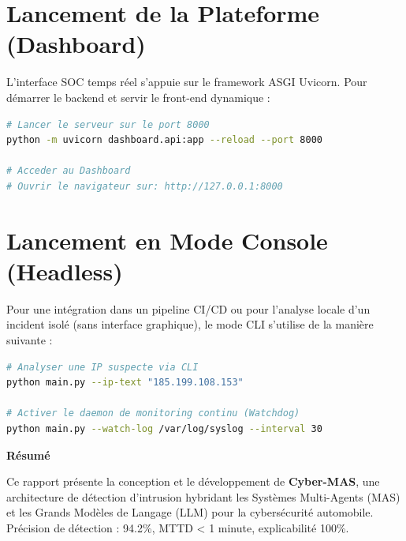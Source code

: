 \documentclass[a4paper, 12pt]{report}
\begin{document}
\section{Lancement de la Plateforme (Dashboard)}
L'interface SOC temps réel s'appuie sur le framework ASGI Uvicorn. Pour démarrer le backend et servir le front-end dynamique :
\begin{lstlisting}[language=bash, basicstyle=\footnotesize\ttfamily\color{codeid}, caption={Lancement du serveur Uvicorn pour l\'API et le Dashboard.}]
# Lancer le serveur sur le port 8000
python -m uvicorn dashboard.api:app --reload --port 8000

# Acceder au Dashboard
# Ouvrir le navigateur sur: http://127.0.0.1:8000
\end{lstlisting}

\section{Lancement en Mode Console (Headless)}
Pour une intégration dans un pipeline CI/CD ou pour l'analyse locale d'un incident isolé (sans interface graphique), le mode CLI s'utilise de la manière suivante :
\begin{lstlisting}[language=bash, basicstyle=\footnotesize\ttfamily\color{codeid}, caption={Commandes d\'exécution de Cyber-MAS en mode console (CLI).}]
# Analyser une IP suspecte via CLI
python main.py --ip-text "185.199.108.153"

# Activer le daemon de monitoring continu (Watchdog)
python main.py --watch-log /var/log/syslog --interval 30
\end{lstlisting}


\newpage
\thispagestyle{empty}
\null

\newpage
\thispagestyle{empty}

\vspace*{2cm}
\begin{center}
    {\large \textbf{Résumé}}
\end{center}
\vspace{0.5cm}
\noindent Ce rapport présente la conception et le développement de \textbf{Cyber-MAS}, une architecture de détection d'intrusion hybridant les Systèmes Multi-Agents (MAS) et les Grands Modèles de Langage (LLM) pour la cybersécurité automobile. Précision de détection : 94.2\%, MTTD < 1 minute, explicabilité 100\%.
\end{document}
